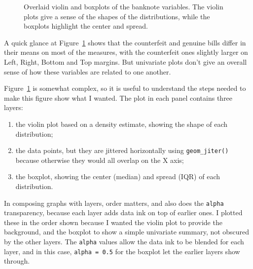 \documentclass[
  letterpaper,
  10pt,
  krantz2]{krantz}
\providecommand{\tightlist}{%
  \setlength{\itemsep}{0pt}\setlength{\parskip}{0pt}}\usepackage{longtable,booktabs,array}
\begin{document}
{\begin{figure}[H]
{}

\caption{\label{fig-banknote-violin}Overlaid violin and boxplots of the
banknote variables. The violin plots give a sense of the shapes of the
distributions, while the boxplots highlight the center and spread.}

\end{figure}%

A quick glance at Figure~\ref{fig-banknote-violin} shows that the
counterfeit and genuine bills differ in their means on most of the
measures, with the counterfeit ones slightly larger on Left, Right,
Bottom and Top margins. But univariate plots don't give an overall sense
of how these variables are related to one another.

\begin{tcolorbox}[enhanced jigsaw, colback=white, titlerule=0mm, toprule=.15mm, opacityback=0, leftrule=.75mm, opacitybacktitle=0.6, left=2mm, arc=.35mm, colframe=quarto-callout-note-color-frame, breakable, bottomtitle=1mm, toptitle=1mm, title=\textcolor{quarto-callout-note-color}{\faInfo}\hspace{0.5em}{\textbf{Graph craft}: Layers and transparency}, rightrule=.15mm, bottomrule=.15mm, coltitle=black, colbacktitle=quarto-callout-note-color!10!white]

Figure~\ref{fig-banknote-violin} is somewhat complex, so it is useful to
understand the steps needed to make this figure show what I wanted. The
plot in each panel contains three layers:

\begin{enumerate}
\def\labelenumi{(\arabic{enumi})}
\tightlist
\item
  the violin plot based on a density estimate, showing the shape of each
  distribution;
\item
  the data points, but they are jittered horizontally using
  \texttt{geom\_jiter()} because otherwise they would all overlap on the
  X axis;
\item
  the boxplot, showing the center (median) and spread (IQR) of each
  distribution.
\end{enumerate}

In composing graphs with layers, order matters, and also does the
\texttt{alpha} transparency, because each layer adds data ink on top of
earlier ones. I plotted these in the order shown because I wanted the
violin plot to provide the background, and the boxplot to show a simple
univariate summary, not obscured by the other layers. The \texttt{alpha}
values allow the data ink to be blended for each layer, and in this
case, \texttt{alpha\ =\ 0.5} for the boxplot let the earlier layers show
through.


\end{tcolorbox}}
\end{document}
